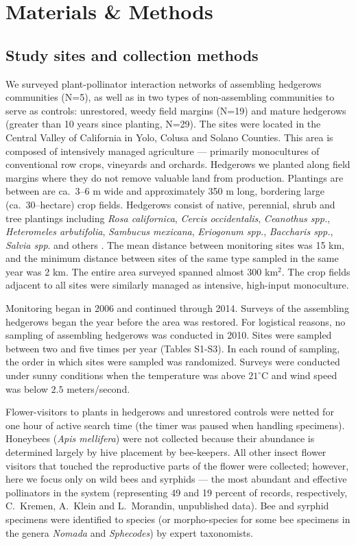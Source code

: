 \documentclass[12pt]{article}
\begin{document}
\section*{Materials \& Methods}
\label{sec:methods}

\subsection*{Study sites and collection methods}
\label{sec:study-sites}

We surveyed plant-pollinator interaction networks of assembling
hedgerows communities (N=5), as well as in two types of non-assembling
communities to serve as controls: unrestored, weedy field margins
(N=19) and mature hedgerows (greater than 10 years since planting,
N=29). The sites were located in the Central Valley of California in
Yolo, Colusa and Solano Counties. This area is composed of intensively
managed agriculture --- primarily monocultures of conventional row
crops, vineyards and orchards. Hedgerows we planted along field
margins where they do not remove valuable land from
production. Plantings are between are ca.~3--6 m wide and
approximately 350 m long, bordering large (ca.\ 30--hectare) crop
fields. Hedgerows consist of native, perennial, shrub and tree
plantings including \textit{Rosa californica}, \textit{Cercis
  occidentalis}, \textit{Ceanothus spp.}, \textit{Heteromeles
  arbutifolia}, \textit{Sambucus mexicana}, \textit{Eriogonum spp.},
\textit{Baccharis spp.}, \textit{Salvia spp}. and others
\citep{kremen-2015-602, mgonigle-2015-x}. The mean distance between
monitoring sites was 15 km, and the minimum distance between sites of
the same type sampled in the same year was 2 km.  The entire area
surveyed spanned almost 300 km$^2$. The crop fields adjacent to all
sites were similarly managed as intensive, high-input monoculture.

Monitoring began in 2006 and continued through 2014. Surveys of the
assembling hedgerows began the year before the area was restored. For
logistical reasons, no sampling of assembling hedgerows was conducted
in 2010. Sites were sampled between two and five times per year
(Tables S1-S3). In each round of sampling, the order in which sites
were sampled was randomized. Surveys were conducted under sunny
conditions when the temperature was above $21^{\circ}\mathrm{C}$ and
wind speed was below $2.5$ meters/second.

Flower-visitors to plants in hedgerows and unrestored controls were
netted for one hour of active search time (the timer was paused when
handling specimens). Honeybees (\textit{Apis mellifera}) were not
collected because their abundance is determined largely by hive
placement by bee-keepers. All other insect flower visitors that
touched the reproductive parts of the flower were collected; however,
here we focus only on wild bees and syrphids --- the most abundant and
effective pollinators in the system (representing 49 and 19 percent of
records, respectively, C.~Kremen, A.~Klein and L.~Morandin,
unpublished data). Bee and syrphid specimens were identified to
species (or morpho-species for some bee specimens in the genera
\textit{Nomada} and \textit{Sphecodes}) by expert taxonomists.
\end{document}
